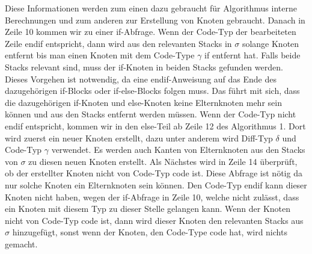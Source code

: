 Diese Informationen werden zum einen dazu gebraucht für Algorithmus interne Berechnungen und zum anderen zur Erstellung von Knoten gebraucht. Danach in Zeile 10 kommen wir zu einer if-Abfrage. Wenn der Code-Typ der bearbeiteten Zeile endif entspricht, dann wird aus den relevanten Stacks in $\sigma$ solange Knoten entfernt bis man einen Knoten mit dem Code-Type $\gamma$ if entfernt hat. Falls beide Stacks relevant sind, muss der if-Knoten in beiden Stacks gefunden werden. Dieses Vorgehen ist notwendig, da eine endif-Anweisung auf das Ende des dazugehörigen if-Blocks oder if-else-Blocks folgen muss. Das führt mit sich, dass die dazugehörigen if-Knoten und else-Knoten keine Elternknoten mehr sein können und aus den Stacks entfernt werden müssen. Wenn der Code-Typ nicht endif entspricht, kommen wir in den else-Teil ab Zeile 12 des Algorithmus 1. Dort wird zuerst ein neuer Knoten erstellt, dazu unter anderem wird Diff-Typ $\delta$ und Code-Typ $\gamma$ verwendet. Es werden auch Kanten von Elternknoten aus den Stacks von $\sigma$ zu diesen neuen Knoten erstellt. Als Nächstes wird in Zeile 14 überprüft, ob der erstellter Knoten nicht von Code-Typ code ist. Diese Abfrage ist nötig da nur solche Knoten ein Elternknoten sein können. Den Code-Typ endif kann dieser Knoten nicht haben, wegen der if-Abfrage in Zeile 10, welche nicht zulässt, dass ein Knoten mit diesem Typ zu dieser Stelle gelangen kann.  Wenn der Knoten nicht von Code-Typ code ist, dann wird dieser Knoten den relevanten Stacks aus $\sigma$ hinzugefügt, sonst wenn der Knoten, den Code-Type code hat, wird nichts gemacht.\\


